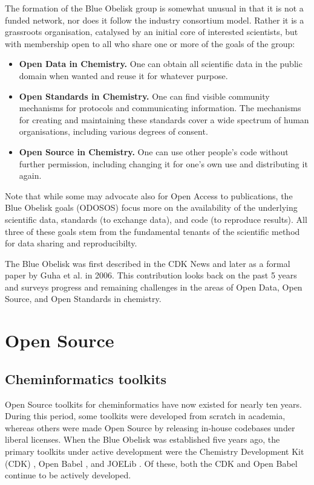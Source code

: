 \documentclass[10pt]{bmc_article}
\newenvironment{bmcformat}{\fussy\setboolean{publ}{true}}{\fussy}
\begin{document}
\begin{bmcformat}
The formation of the Blue Obelisk group is somewhat unusual in that it
is not a funded network, nor does it follow the industry consortium
model. Rather it is a grassroots organisation, catalysed by an initial
core of interested scientists, but with membership open to all who
share one or more of the goals of the group:
\begin{itemize}
\item {\bf Open Data in Chemistry.} One can obtain all scientific data in the public domain when
wanted and reuse it for whatever purpose.
\item {\bf Open Standards in Chemistry.} One can find visible community mechanisms for
protocols and communicating information. The mechanisms for creating
and maintaining these standards cover a wide spectrum of human
organisations, including various degrees of consent.
\item {\bf Open Source in Chemistry.} One can use other people's code without further
permission, including changing it for one's own use and distributing
it again.
\end{itemize}

Note that while some may advocate also for Open Access to
publications, the Blue Obelisk goals (ODOSOS) focus more on the
availability of the underlying scientific data, standards (to exchange
data), and code (to reproduce results). All three of these goals stem
from the fundamental tenants of the scientific method for data sharing
and reproducibilty.

The Blue Obelisk was first described in the CDK News \cite{CDKNewsBO} and
later as a formal paper by Guha et al.\cite{Guha2006} in
2006. This contribution looks back on the past 5 years and surveys
progress and remaining challenges in the areas of Open Data, Open
Source, and Open Standards in chemistry.

\section*{Open Source}

\subsection*{Cheminformatics toolkits}

Open Source toolkits for cheminformatics have now existed for nearly
ten years. During this period, some toolkits were developed from
scratch in academia, whereas others were made Open Source by releasing in-house
codebases under liberal licenses. When the Blue Obelisk was
established five years ago, the primary toolkits under active development
were the Chemistry Development Kit (CDK)
\cite{Steinbeck2003, Steinbeck2006}, Open Babel \cite{WebOpenBabel},
and JOELib \cite{WebJOELib}. Of these, both the CDK and Open Babel
continue to be actively developed.


\end{bmcformat}
\end{document}
